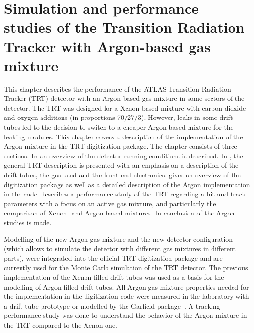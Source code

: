 \chapter{Simulation and performance studies of the Transition Radiation Tracker with Argon-based gas mixture}
\label{chap:TRT}


This chapter describes the performance of the ATLAS Transition Radiation Tracker (TRT) detector with an Argon-based gas mixture in some sectors of the detector.
The TRT was designed for a Xenon-based mixture with carbon dioxide and oxygen additions (in proportions 70/27/3).
However, leaks in some drift tubes led to the decision to switch to a cheaper Argon-based mixture for the leaking modules.
This chapter covers a description of the implementation of the Argon mixture in the TRT digitization package.
The chapter consists of three sections. In  an overview of the detector running conditions is described. In , the general TRT description is presented with an emphasis on a description of the drift tubes, the gas used and the front-end electronics.
 gives an overview of the digitization package as well as a detailed description of the Argon implementation in the code.
 describes a performance study of the TRT regarding a hit and track parameters with a focus on an active gas mixture, and particularly the comparison of 
Xenon- and Argon-based mixtures.
In  conclusion of the Argon studies is made.

Modelling of the new Argon gas mixture and the new detector configuration (which allows to simulate the detector with different gas mixtures in different parts), 
were integrated into the official TRT digitization package and are currently used for the Monte Carlo simulation of the TRT detector. 
The previous implementation of the Xenon-filled drift tubes was used as a basis for the modelling of Argon-filled drift tubes.
All Argon gas mixture properties needed for the implementation in the digitization code were measured in the laboratory with a drift tube prototype 
or modelled by the Garfield package~\cite{garfield_program}.
A tracking performance study was done to understand the behavior of the Argon mixture in the TRT compared to the Xenon one.

